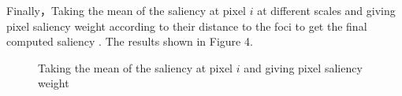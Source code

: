 \documentclass[10pt,twocolumn,letterpaper]{article}
\begin{document}
 
 \indent \indent Finally，Taking the mean of the saliency at pixel $i$ at different scales and giving pixel saliency weight according to their distance to the foci to get the final computed saliency . The results shown in Figure 4.
 \begin{figure}[h]
 	\centering
 
 	\caption{Taking the mean of the saliency at pixel $i$ and giving pixel saliency weight }
 	
 	
 \end{figure}


{\small


}
\end{document}
